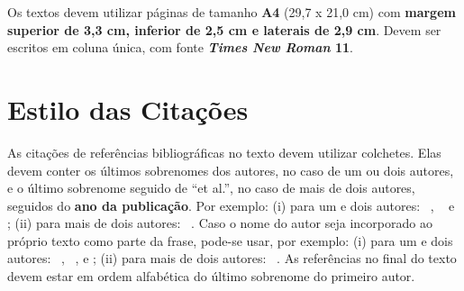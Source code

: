 \documentclass[a4paper,11pt]{article}
\begin{document}
Os textos devem utilizar páginas de tamanho \textbf{A4} (29,7 x 21,0 cm) com \textbf{margem superior de 3,3 cm, inferior de 2,5 cm e laterais de 2,9 cm}. Devem ser escritos em coluna única, com fonte \textbf{\textit{Times New Roman} 11}. 



\section{Estilo das Citações}

 
As citações de referências bibliográficas no texto devem utilizar colchetes. Elas devem conter os últimos sobrenomes dos autores, no caso de um ou dois autores, e o último sobrenome seguido de ``et al.'', no caso de mais de dois autores, seguidos do \textbf{ano da publicação}. Por exemplo: (i) para um e dois autores: ~\citep{anna:06}, ~\citep{smith:02} e \citep{machado}; (ii) para mais de dois autores: ~\citep{silva:99}. Caso o nome do autor seja incorporado ao próprio texto como parte da frase, pode-se usar, por exemplo: (i) para um e dois autores: ~\citet{anna:06}, ~\citet{pele:04}, \citet{web:16} e \citet{machado}; (ii) para mais de dois autores: ~\citet{silva:99}. As referências no final do texto devem estar em ordem alfabética do último sobrenome do primeiro autor.
 

~\\


\end{document}
